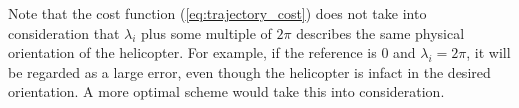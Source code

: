 Note that the cost function (\ref{eq:trajectory_cost}) does not take into consideration that $\lambda_i$ plus some multiple of $2\pi$ describes the same physical orientation of the helicopter. For example, if the reference is $0$ and $\lambda_i = 2\pi$, it will be regarded as a large error, even though the helicopter is infact in the desired orientation. A more optimal scheme would take this into consideration.
